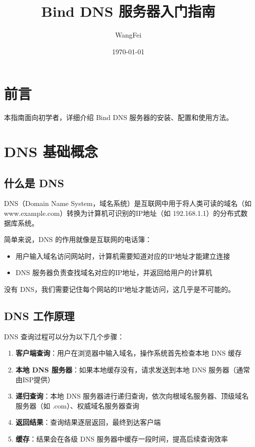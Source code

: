 \documentclass[12pt,UTF8]{ctexbook}
\title{\heiti\zihao{0} Bind DNS 服务器入门指南}
\author{WangFei}
\date{\today}
\begin{document}
\maketitle
\tableofcontents

\frontmatter
\chapter{前言}

本指南面向初学者，详细介绍 Bind DNS 服务器的安装、配置和使用方法。

\mainmatter

\chapter{DNS 基础概念}
\label{chap:dns_basics}

\section{什么是 DNS}
\label{sec:what_is_dns}

DNS（Domain Name System，域名系统）是互联网中用于将人类可读的域名（如 www.example.com）转换为计算机可识别的IP地址（如 192.168.1.1）的分布式数据库系统。

简单来说，DNS 的作用就像是互联网的电话簿：
\begin{itemize}
    \item 用户输入域名访问网站时，计算机需要知道对应的IP地址才能建立连接
    \item DNS 服务器负责查找域名对应的IP地址，并返回给用户的计算机
\end{itemize}

没有 DNS，我们需要记住每个网站的IP地址才能访问，这几乎是不可能的。

\section{DNS 工作原理}
\label{sec:dns_working_principle}

DNS 查询过程可以分为以下几个步骤：

\begin{enumerate}
    \item \textbf{客户端查询}：用户在浏览器中输入域名，操作系统首先检查本地 DNS 缓存
    
    \item \textbf{本地 DNS 服务器}：如果本地缓存没有，请求发送到本地 DNS 服务器（通常由ISP提供）
    
    \item \textbf{递归查询}：本地 DNS 服务器进行递归查询，依次向根域名服务器、顶级域名服务器（如 .com）、权威域名服务器查询
    
    \item \textbf{返回结果}：查询结果逐层返回，最终到达客户端
    
    \item \textbf{缓存}：结果会在各级 DNS 服务器中缓存一段时间，提高后续查询效率
\end{enumerate}
\end{document}
